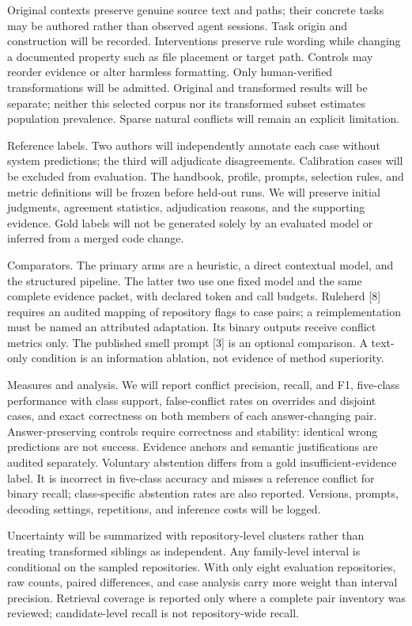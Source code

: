 \documentclass[10pt,conference]{IEEEtran}
\begin{document}
Original contexts preserve genuine source text and paths; their concrete tasks may be authored rather than observed agent sessions. Task origin and construction will be recorded. Interventions preserve rule wording while changing a documented property such as file placement or target path. Controls may reorder evidence or alter harmless formatting. Only human-verified transformations will be admitted. Original and transformed results will be separate; neither this selected corpus nor its transformed subset estimates population prevalence. Sparse natural conflicts will remain an explicit limitation.


Reference labels. Two authors will independently annotate each case without system predictions; the third will adjudicate disagreements. Calibration cases will be excluded from evaluation. The handbook, profile, prompts, selection rules, and metric definitions will be frozen before held-out runs. We will preserve initial judgments, agreement statistics, adjudication reasons, and the supporting evidence. Gold labels will not be generated solely by an evaluated model or inferred from a merged code change.


Comparators. The primary arms are a heuristic, a direct contextual model, and the structured pipeline. The latter two use one fixed model and the same complete evidence packet, with declared token and call budgets. Ruleherd [8] requires an audited mapping of repository flags to case pairs; a reimplementation must be named an attributed adaptation. Its binary outputs receive conflict metrics only. The published smell prompt [3] is an optional comparison. A text-only condition is an information ablation, not evidence of method superiority.


Measures and analysis. We will report conflict precision, recall, and F1, five-class performance with class support, false-conflict rates on overrides and disjoint cases, and exact correctness on both members of each answer-changing pair. Answer-preserving controls require correctness and stability: identical wrong predictions are not success. Evidence anchors and semantic justifications are audited separately. Voluntary abstention differs from a gold insufficient-evidence label. It is incorrect in five-class accuracy and misses a reference conflict for binary recall; class-specific abstention rates are also reported. Versions, prompts, decoding settings, repetitions, and inference costs will be logged.


Uncertainty will be summarized with repository-level clusters rather than treating transformed siblings as independent. Any family-level interval is conditional on the sampled repositories. With only eight evaluation repositories, raw counts, paired differences, and case analysis carry more weight than interval precision. Retrieval coverage is reported only where a complete pair inventory was reviewed; candidate-level recall is not repository-wide recall.
\end{document}

